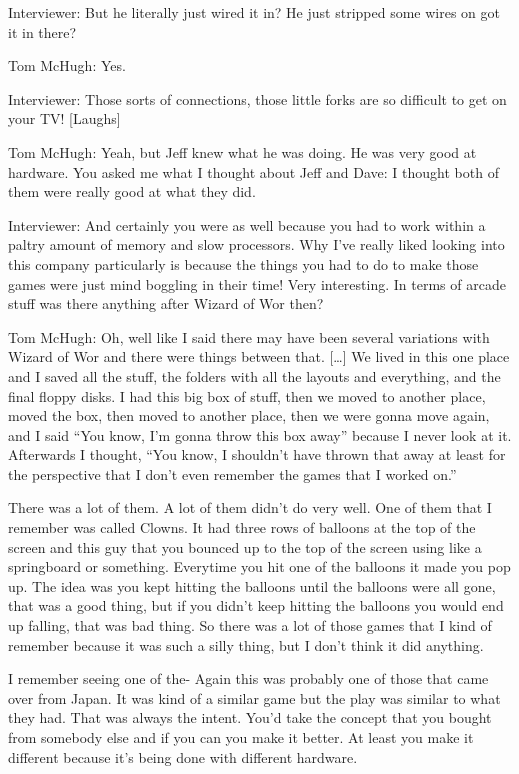 \textcolor{interviewer}{Interviewer:} But he literally just wired it in? He just stripped some wires on got it in there?

\textcolor{interviewee}{Tom McHugh:} Yes.

\textcolor{interviewer}{Interviewer:} Those sorts of connections, those little forks are so difficult to get on your TV! [Laughs]

\textcolor{interviewee}{Tom McHugh:} Yeah, but Jeff knew what he was doing. He was very good at hardware. You asked me what I thought about Jeff and Dave: I thought both of them were really good at what they did.

\textcolor{interviewer}{Interviewer:} And certainly you were as well because you had to work within a paltry amount of memory and slow processors. Why I’ve really liked looking into this company particularly is because the things you had to do to make those games were just mind boggling in their time! Very interesting. In terms of arcade stuff was there anything after Wizard of Wor then?

\textcolor{interviewee}{Tom McHugh:} Oh, well like I said there may have been several variations with Wizard of Wor and there were things between that. […] We lived in this one place and I saved all the stuff, the folders with all the layouts and everything, and the final floppy disks. I had this big box of stuff, then we moved to another place, moved the box, then moved to another place, then we were gonna move again, and I said “You know, I’m gonna throw this box away” because I never look at it. Afterwards I thought, “You know, I shouldn’t have thrown that away at least for the perspective that I don’t even remember the games that I worked on.”

There was a lot of them. A lot of them didn’t do very well. One of them that I remember was called Clowns. It had three rows of balloons at the top of the screen and this guy that you bounced up to the top of the screen using like a springboard or something. Everytime you hit one of the balloons it made you pop up. The idea was you kept hitting the balloons until the balloons were all gone, that was a good thing, but if you didn’t keep hitting the balloons you would end up falling, that was bad thing. So there was a lot of those games that I kind of remember because it was such a silly thing, but I don’t think it did anything.

I remember seeing one of the- Again this was probably one of those that came over from Japan. It was kind of a similar game but the play was similar to what they had. That was always the intent. You’d take the concept that you bought from somebody else and if you can you make it better. At least you make it different because it’s being done with different hardware.

